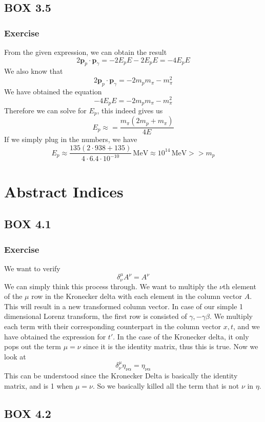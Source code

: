\documentclass[12pt]{memoir}
\newcommand{\paren}[1]{\left( #1 \right)}
\newcommand{\etensor}[3]{#1_{#3}^{#2}}
\begin{document}
    \section{BOX 3.5}
    \subsection{Exercise}
    From the given expression, we can obtain the result
    \[
    2\mathbf{p}_p\cdot \mathbf{p}_\gamma = -2E_pE-2E_pE = -4E_pE
    \]
    We also know that 
    \[
    2\mathbf{p}_p\cdot \mathbf{p}_\gamma = -2m_pm_{\pi} -m_{\pi}^2
    \]
    We have obtained the equation
    \[
     -4E_pE = -2m_pm_{\pi} -m_{\pi}^2
    \]
    Therefore we can solve for $E_p$, this indeed gives us
    \[
    E_p \approx = \frac{m_{\pi}\paren{2m_p + m_{\pi}}}{4E}
    \]
    If we simply plug in the numbers, we have
    \[
    E_p\approx \frac{135\paren{2\cdot938+135}}{4\cdot 6.4\cdot 10^{-10}}\,\text{MeV} \approx 10^{14}\,\text{MeV} >> m_p
    \]

\begingroup
\let\clearpage\relax
\chapter{Abstract Indices}
\endgroup 
\section{BOX 4.1}
\subsection{Exercise}
We want to verify
\[
\etensor{\delta}{\mu}{\nu}A^{\nu}=A^\nu
\]
We can simply think this process through. We want to multiply the $\nu$th element of the $\mu$ row in the Kronecker delta with each element in the column vector $A$. This will result in a new transformed column vector. In case of our simple 1 dimensional Lorenz transform, the first row is consisted of $\gamma, -\gamma\beta$. We multiply each term with their corresponding counterpart in the column vector $x,t$, and we have obtained the expression for $t'$. In the case of the Kronecker delta, it only pops out the term $\mu=\nu$ since it is the identity matrix, thus this is true. Now we look at
\[
\etensor{\delta}{\mu}{\nu}\eta_{\nu\alpha} = \eta_{\nu\alpha}
\]
This can be understood since the Kronecker Delta is basically the identity matrix, and is 1 when $\mu=\nu$. So we basically killed all the term that is not $\nu$ in $\eta$.


\section{BOX 4.2}
\end{document}
